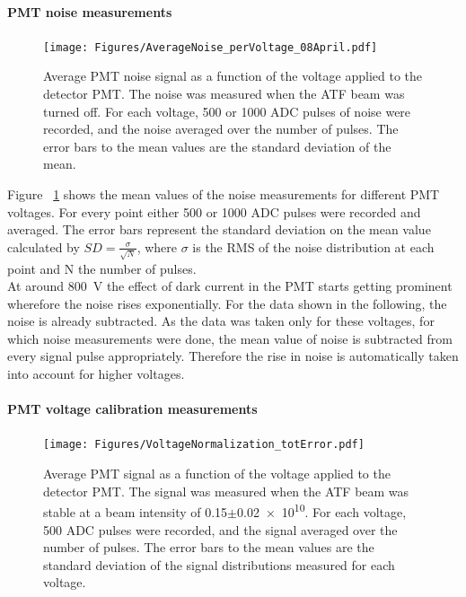 \paragraph{PMT noise measurements}
\begin{figure}
\centering
\texttt{[image: Figures/AverageNoise\_perVoltage\_08April.pdf]}
\caption[RHUL Cherenkov detector noise]{Average PMT noise signal as a function of the voltage applied to the detector PMT. The noise was measured when the ATF beam was turned off. For each voltage, 500 or 1000 ADC pulses of noise were recorded, and the noise averaged over the number of pulses. The error bars to the mean values are the standard deviation of the mean.}
\label{fig:AverageNoise}
\end{figure}
Figure ~\ref{fig:AverageNoise} shows the mean values of the noise measurements for different PMT voltages. For every point either 500 or 1000 ADC pulses were recorded and averaged. The error bars represent the standard deviation on the mean value calculated by $SD=\frac{\sigma}{\sqrt{N}}$, where $\sigma$ is the RMS of the noise distribution at each point and N the number of pulses.\\
At around \SI{800}{\volt} the effect of dark current in the PMT starts getting prominent wherefore the noise rises exponentially. For the data shown in the following, the noise is already subtracted. As the data was taken only for these voltages, for which noise measurements were done, the mean value of noise is subtracted from every signal pulse appropriately. Therefore the rise in noise is automatically taken into account for higher voltages.

\paragraph{PMT voltage calibration measurements}
\begin{figure}
\centering
\texttt{[image: Figures/VoltageNormalization\_totError.pdf]}
\caption[RHUL Cherenkov detector voltage calibration]{Average PMT signal as a function of the voltage applied to the detector PMT. The signal was measured when the ATF beam was stable at a beam intensity of \num{0.15}$\pm$\num{0.02e10}. For each voltage, 500 ADC pulses were recorded, and the signal averaged over the number of pulses. The error bars to the mean values are the standard deviation of the signal distributions measured for each voltage.}
\label{fig:VoltageNormalization}
\end{figure}

